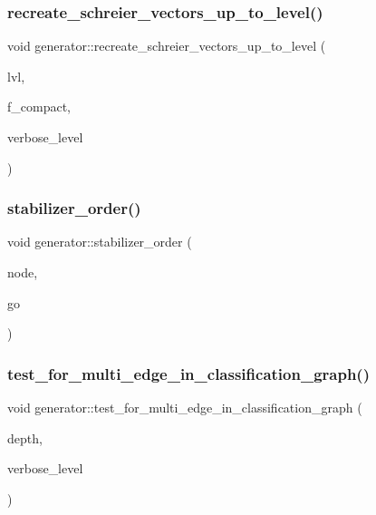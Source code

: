 \subsubsection{\texorpdfstring{recreate\+\_\+schreier\+\_\+vectors\+\_\+up\+\_\+to\+\_\+level()}{recreate\_schreier\_vectors\_up\_to\_level()}}
{\footnotesize\ttfamily void generator\+::recreate\+\_\+schreier\+\_\+vectors\+\_\+up\+\_\+to\+\_\+level (\begin{DoxyParamCaption}\item[{\mbox{\hyperlink{galois_8h_a09fddde158a3a20bd2dcadb609de11dc}{I\+NT}}}]{lvl,  }\item[{\mbox{\hyperlink{galois_8h_a09fddde158a3a20bd2dcadb609de11dc}{I\+NT}}}]{f\+\_\+compact,  }\item[{\mbox{\hyperlink{galois_8h_a09fddde158a3a20bd2dcadb609de11dc}{I\+NT}}}]{verbose\+\_\+level }\end{DoxyParamCaption})}

\mbox{\label{classgenerator_abab7963cd9296ce0328c67ebb204c98c}} 
\subsubsection{\texorpdfstring{stabilizer\+\_\+order()}{stabilizer\_order()}}
{\footnotesize\ttfamily void generator\+::stabilizer\+\_\+order (\begin{DoxyParamCaption}\item[{\mbox{\hyperlink{galois_8h_a09fddde158a3a20bd2dcadb609de11dc}{I\+NT}}}]{node,  }\item[{\mbox{\hyperlink{classlonginteger__object}{longinteger\+\_\+object}} \&}]{go }\end{DoxyParamCaption})}

\mbox{\label{classgenerator_a1555955d5871841a847146f6f78cd42d}} 
\subsubsection{\texorpdfstring{test\+\_\+for\+\_\+multi\+\_\+edge\+\_\+in\+\_\+classification\+\_\+graph()}{test\_for\_multi\_edge\_in\_classification\_graph()}}
{\footnotesize\ttfamily void generator\+::test\+\_\+for\+\_\+multi\+\_\+edge\+\_\+in\+\_\+classification\+\_\+graph (\begin{DoxyParamCaption}\item[{\mbox{\hyperlink{galois_8h_a09fddde158a3a20bd2dcadb609de11dc}{I\+NT}}}]{depth,  }\item[{\mbox{\hyperlink{galois_8h_a09fddde158a3a20bd2dcadb609de11dc}{I\+NT}}}]{verbose\+\_\+level }\end{DoxyParamCaption})}

